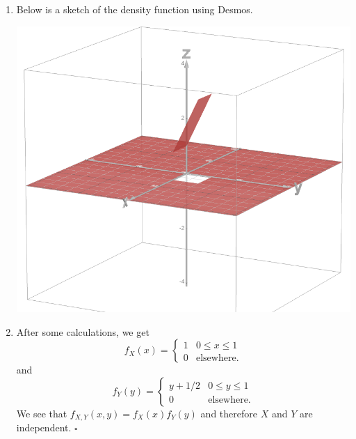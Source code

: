 \begin{problem}
    \begin{enumerate}[label=\alph*)]
        \item Below is a sketch of the density function using Desmos.
            \begin{center}
            \includegraphics[scale=0.3]{figure2.png}
            \end{center}
        \item After some calculations, we get
            \[
                f_X (x) = \left\lbrace \begin{matrix} 1 & 0 \leq x \leq 1 \\ 0 & \text{elsewhere.} \end{matrix} \right.
            \]
        and
            \[
                f_Y (y) = \left\lbrace \begin{matrix} y + 1/2 & 0 \leq y \leq 1 \\ 0 & \text{elsewhere.} \end{matrix} \right. 
            \]
        We see that $f_{X, Y} (x, y) = f_X (x) f_Y (y)$ and therefore $X$ and $Y$ are independent. \hfill $\square$
    \end{enumerate}
\end{problem}

